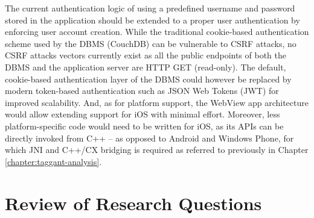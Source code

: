 \documentclass[thesis.tex]{subfiles}
\begin{document}
The current authentication logic of using a predefined username and password stored in the application should be extended to a proper user authentication by enforcing user account creation. While the traditional cookie-based authentication scheme used by the DBMS (CouchDB) can be vulnerable to CSRF attacks, no CSRF attacks vectors currently exist as all the public endpoints of both the DBMS and the application server are HTTP GET (read-only). The default, cookie-based authentication layer of the DBMS could however be replaced by modern token-based authentication such as JSON Web Tokens (JWT) for improved scalability. And, as for platform support, the WebView app architecture would allow extending support for iOS with minimal effort. Moreover, less platform-specific code would need to be written for iOS, as its APIs can be directly invoked from C++ -- as opposed to Android and Windows Phone, for which JNI and C++/CX bridging is required as referred to previously in Chapter \ref{chapter:taggant-analysis}.\clearpage

\section{Review of Research Questions}
\end{document}
